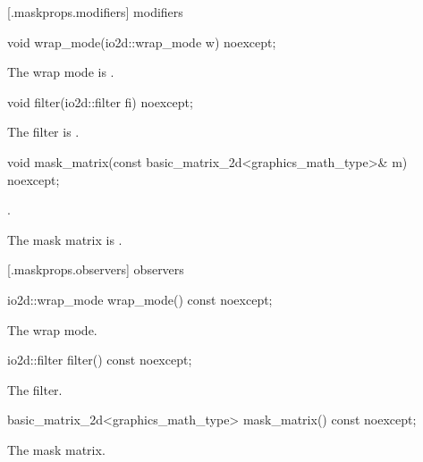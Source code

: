 [\iotwod.maskprops.modifiers] { modifiers}

%
\begin{itemdecl}
void wrap_mode(io2d::wrap_mode w) noexcept;
\end{itemdecl}
\begin{itemdescr}
\pnum
\effects
The wrap mode is .
\end{itemdescr}

%
\begin{itemdecl}
void filter(io2d::filter fi) noexcept;
\end{itemdecl}
\begin{itemdescr}
\pnum
\effects
The filter is .
\end{itemdescr}

%
\begin{itemdecl}
void mask_matrix(const basic_matrix_2d<graphics_math_type>& m) noexcept;
\end{itemdecl}
\begin{itemdescr}
\pnum
\requires
{}.

\pnum
\effects
The mask matrix is .
\end{itemdescr}

 [\iotwod.maskprops.observers] { observers}

%
\begin{itemdecl}
io2d::wrap_mode wrap_mode() const noexcept;
\end{itemdecl}
\begin{itemdescr}
\pnum
\returns
The wrap mode.
\end{itemdescr}

%
\begin{itemdecl}
io2d::filter filter() const noexcept;
\end{itemdecl}
\begin{itemdescr}
\pnum
\returns
The filter.
\end{itemdescr}

%
\begin{itemdecl}
basic_matrix_2d<graphics_math_type> mask_matrix() const noexcept;
\end{itemdecl}
\begin{itemdescr}
\pnum
\returns
The mask matrix.
\end{itemdescr}
